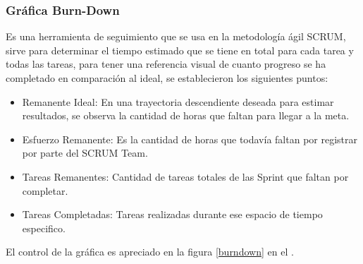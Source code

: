 \subsubsection{Gráfica Burn-Down}

Es una herramienta de seguimiento que se usa en la metodología ágil SCRUM, sirve para determinar el tiempo estimado que se tiene en total para cada tarea y todas las tareas, para tener una referencia visual de cuanto progreso se ha completado en comparación al ideal, se establecieron los siguientes puntos:

\begin{itemize}
	\item Remanente Ideal: En una trayectoria descendiente deseada para estimar resultados, se observa la cantidad de horas que faltan para llegar a la meta.
	\item Esfuerzo Remanente: Es la cantidad de horas que todavía faltan por registrar por parte del SCRUM Team.
	\item Tareas Remanentes: Cantidad de tareas totales de las Sprint que faltan por completar.
	\item Tareas Completadas: Tareas realizadas durante ese espacio de tiempo especifico. 
\end{itemize}
				
El control de la gráfica es apreciado en la figura \ref{burndown} en el .



